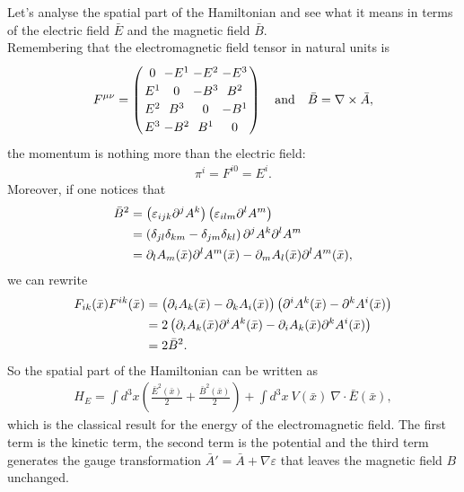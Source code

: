 Let's analyse the spatial part of the Hamiltonian and see what it means in terms of the electric field $\bar{E}$ and the magnetic field $\bar{B}$. \\
Remembering that the electromagnetic field tensor in natural units is
\begin{align}
F^{\mu \nu} = 
\left( 
\arraycolsep=1.4pt\def\arraystretch{1.2}
\begin{array}{cccc}
0 & - E^1 & - E^2 & - E^3 \\
E^1 & 0 & - B^3 & B^2 \\
E^2 & B^3 & 0 & - B^1 \\
E^3 & - B^2 & B^1 & 0  
\end{array} \right) \ \ \
\text{and} \ \ \
\bar{B} = \nabla \times \bar{A},
\end{align}
the momentum is nothing more than the electric field:
\begin{align}
\pi^i = F^{i 0} = E^i.
\end{align}
Moreover, if one notices that 
\begin{align}
\bar{B}^2 &= \left( \varepsilon_{ijk} \partial^j A^k \right) \left( \varepsilon_{ilm} \partial^l A^m \right) \notag \\
&= \left( \delta_{jl} \delta_{km} - \delta_{jm} \delta_{kl} \right)  \partial^j A^k \partial^l A^m \notag \\
&= \partial_l A_m(\bar{x}) \partial^l A^m(\bar{x}) - \partial_m A_l(\bar{x}) \partial^l A^m(\bar{x}), 
\end{align}
we can rewrite
\begin{align}
F_{i k}(\bar{x}) F^{i k}(\bar{x}) &= \big( \partial_i A_k(\bar{x}) - \partial_k A_i(\bar{x}) \big) \left( \partial^i A^k(\bar{x}) - \partial^k A^i(\bar{x}) \right) \notag \\
&= 2 \left( \partial_i A_k(\bar{x}) \partial^i A^k(\bar{x}) - \partial_i A_k(\bar{x}) \partial^k A^i(\bar{x}) \right) \notag \\
&= 2 \bar{B}^2.
\end{align}
So the spatial part of the Hamiltonian can be written as
\begin{align}
H_E = \int d^3 x \left( \frac{\bar{E}^2(\bar{x})}{2} + \frac{\bar{B}^2(\bar{x})}{2} \right) + \int d^3 x \ V(\bar{x}) \ \nabla \cdot \bar{E}(\bar{x}),
\end{align}
which is the classical result for the energy of the electromagnetic field. The first term is the kinetic term, the second term is the potential and the third term generates the gauge transformation $\bar{A}' = \bar{A} + \nabla \varepsilon$ that leaves the magnetic field $B$ unchanged.